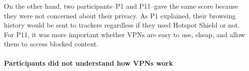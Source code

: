 On the other hand, two participants--P1 and P11--gave the same score because they were not concerned about their privacy. As P1 explained, their browsing history would be sent to trackers regardless if they used Hotspot Shield or not.
For P11, it was more important whether VPNs are easy to use, cheap, and allow
them to access blocked content. 



% 


\paragraph{Participants did not understand how VPNs work}


